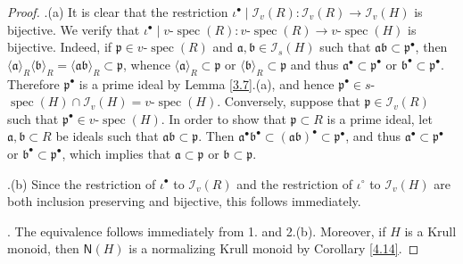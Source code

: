 \documentclass[a4paper]{amsart}
\theoremstyle{definition}
\numberwithin{equation}{section}
\begin{document}
\begin{proof}
.(a) It is clear that the restriction $\iota^{\bullet} \mid
\mathcal I_v (R)  \colon \mathcal I_v (R)  \to \mathcal I_v (H)$ is
bijective. We verify that $\iota^{\bullet} \mid v$-$\operatorname{spec} (R) \colon
v$-$\operatorname{spec} (R) \to v$-$\operatorname{spec} (H)$ is bijective. Indeed, if $\mathfrak
p \in v$-$\operatorname{spec} (R)$ and $\mathfrak a, \mathfrak b \in \mathcal I_s
(H)$ such that $\mathfrak a \mathfrak b \subset \mathfrak
p^{\bullet}$, then $\langle \mathfrak a \rangle_R \langle \mathfrak
b \rangle_R = \langle \mathfrak a \mathfrak b \rangle_R \subset
\mathfrak p$, whence $\langle \mathfrak a \rangle_R \subset
\mathfrak p$ or $\langle \mathfrak b \rangle_R \subset \mathfrak p$
and thus $\mathfrak a^{\bullet} \subset \mathfrak p^{\bullet}$ or
$\mathfrak b^{\bullet} \subset \mathfrak p^{\bullet}$. Therefore
$\mathfrak p^{\bullet}$ is a prime ideal by Lemma \ref{3.7}.(a), and
hence $\mathfrak p^{\bullet} \in  s$-$\operatorname{spec} (H) \cap \mathcal I_v
(H) = v$-$\operatorname{spec} (H)$. Conversely, suppose that $\mathfrak p \in
\mathcal I_v (R)$ such that $\mathfrak p^{\bullet} \in v$-$\operatorname{spec}
(H)$. In order to show that $\mathfrak p \subset R$ is a prime
ideal, let $\mathfrak a, \mathfrak b \subset R$ be ideals such that
$\mathfrak a \mathfrak b \subset \mathfrak p$. Then $\mathfrak
a^{\bullet} \mathfrak b^{\bullet} \subset (\mathfrak a \mathfrak
b)^{\bullet} \subset \mathfrak p^{\bullet}$, and thus $\mathfrak
a^{\bullet} \subset \mathfrak p^{\bullet}$ or $\mathfrak b^{\bullet}
\subset \mathfrak p^{\bullet}$, which implies that $\mathfrak a
\subset \mathfrak p$ or $\mathfrak b \subset \mathfrak p$.

.(b) Since the restriction of $\iota^{\bullet}$ to $\mathcal I_v
(R)$ and the restriction of  $\iota^{\circ}$ to $\mathcal I_v (H)$
are both inclusion preserving and bijective, this follows
immediately.

. The equivalence follows immediately from 1. and 2.(b). Moreover,
if $H$ is a Krull monoid, then $\mathsf N (H)$ is a normalizing
Krull monoid by Corollary \ref{4.14}.
\end{proof}
\end{document}
